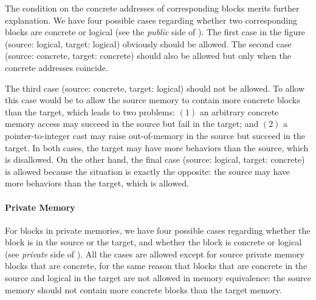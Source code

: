 The condition on the concrete addresses of corresponding blocks
merits further explanation. We have four possible cases
regarding whether two corresponding blocks are concrete or logical (see the
\emph{public} side of ).  The first case in
the figure (\ie source: logical, target: logical) obviously should be
allowed. The second case (\ie source: concrete, target: concrete)
should also be allowed but only when the concrete addresses
coincide. 

The third case (\ie source: concrete, target: logical) should not be
allowed. To allow this case would be to allow the source memory to contain more concrete
blocks than the target, which leads to two problems: $(1)$ an arbitrary
concrete memory access may succeed in the source but fail in the
target; and $(2)$ a pointer-to-integer cast may raise out-of-memory
in the source but succeed in the target.  In both cases, the target
may have more behaviors than the source, which is disallowed.  On the
other hand, the final case (\ie source: logical, target: concrete) is
allowed because the situation is exactly the opposite: the source may
have more behaviors than the target, which is allowed.

\paragraph{Private Memory}
For blocks in private memories, we have four possible cases
regarding whether the block is in the source or the target, and
whether the block is concrete or logical (see \emph{private} side of
).  All the cases are allowed except for
source private memory blocks that are concrete, for the same reason
that blocks that are concrete in the source and logical in the target are not
allowed in memory equivalence: the source memory should not contain
more concrete blocks than the target memory.

